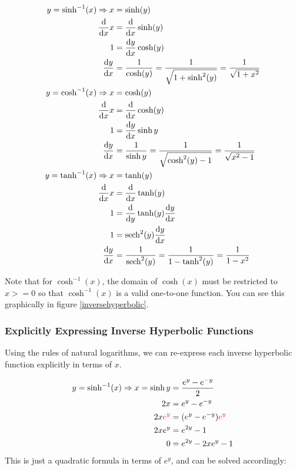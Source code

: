 \documentclass[12pt]{article}
\begin{document}
\begin{equation}
    \begin{split}
        y = \sinh^{-1}(x) \Rightarrow x &= \sinh (y)\\
        \ddx x &= \ddx \sinh(y) \\
        1 &= \dydx \cosh(y)\\
        \dydx &= \frac{1}{\cosh(y)} = \frac{1}{\sqrt{1 + \sinh^2(y)}} = \frac{1}{\sqrt{1+x^2}}\\
        y = \cosh^{-1}(x) \Rightarrow x &= \cosh(y)\\
        \ddx x &= \ddx \cosh(y)\\
        1 &= \dydx \sinh y\\
        \dydx &= \frac{1}{\sinh y} = \frac{1}{\sqrt{\cosh^2(y)-1}} = \frac{1}{\sqrt{x^2-1}}\\
        y = \tanh^{-1}(x) \Rightarrow x &= \tanh(y)\\
        \ddx x &= \ddx \tanh(y)\\
        1 &= \ddy \tanh(y) \dydx\\
        1 &= \sech^2(y) \dydx\\
        \dydx &= \frac{1}{\sech^2(y)} = \frac{1}{1-\tanh^2(y)} = \frac{1}{1-x^2}
    \end{split}
\end{equation}

Note that for $\cosh^{-1}(x)$, the domain of $\cosh(x)$ must be restricted to $x>=0$ so that $\cosh^{-1}(x)$ is a valid one-to-one function. You can see this graphically in figure \ref{inversehyperbolic}.

\subsubsection{Explicitly Expressing Inverse Hyperbolic Functions}

Using the rules of natural logarithms, we can re-express each inverse hyperbolic function explicitly in terms of $x$.

\begin{equation}
    \begin{split}
        y=\sinh^{-1}(x) \Rightarrow x = \sinh y &= \frac{e^y-e^{-y}}{2}\\
        2x &= e^y-e^{-y}\\
        2x\textcolor{red}{e^y} &= (e^y-e^{-y})\textcolor{red}{e^y}\\
        2xe^y &= e^{2y} - 1\\
        0 &= e^{2y} - 2xe^y -1\\
    \end{split}
\end{equation}
This is just a quadratic formula in terms of $e^y$, and can be solved accordingly:
\end{document}
